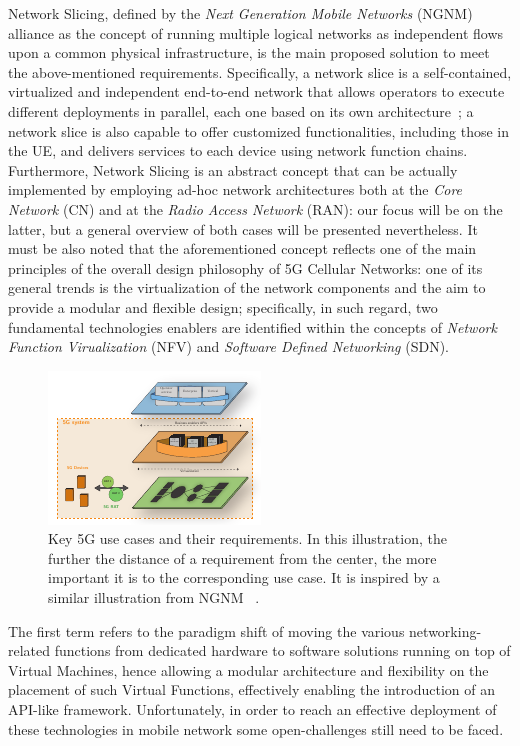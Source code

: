 \documentclass[11pt]{book}
\begin{document}
Network Slicing, defined by the \textit{Next Generation Mobile Networks} (NGNM) alliance as the concept of running multiple logical networks as independent flows upon a common physical infrastructure, is the main proposed solution to meet the above-mentioned requirements. Specifically, a network slice is a self-contained, virtualized and independent end-to-end network that allows operators to execute different deployments in parallel, each one based on its own architecture~\cite{alliance2016description}; a network slice is also capable to offer customized functionalities, including those in the UE, and delivers services to each device using network function chains. Furthermore, Network Slicing is an abstract concept that can be actually implemented by employing ad-hoc network architectures both at the \textit{Core Network} (CN) and at the \textit{Radio Access Network} (RAN): our focus will be on the latter, but a general overview of both cases will be presented nevertheless. 
It must be also noted that the aforementioned concept reflects one of the main principles of the overall design philosophy of 5G Cellular Networks: one of its general trends is the virtualization of the network components and the aim to provide a modular and flexible design; specifically, in such regard, two fundamental technologies enablers are identified within the concepts of \textit{Network Function Virualization} (NFV) and \textit{Software Defined Networking} (SDN)\cite{yousaf2017nfv, kaloxylos2018survey}. 
\begin{figure}[t]
    \centering
    \includegraphics[scale=3.65]{figures/NFV.pdf}
     \setlength\belowcaptionskip{.1cm}
  \caption{Key 5G use cases and their requirements. In this illustration, the further the distance of a requirement from the center, the more important it is to the corresponding use case. It is inspired by a similar illustration from NGNM ~\cite{alliance2015description}.}
    \label{Fig:NFV}
\end{figure}
The first term refers to the paradigm shift of moving the various networking-related functions from dedicated hardware to software solutions running on top of Virtual Machines, hence allowing a modular architecture and flexibility on the placement of such Virtual Functions, effectively enabling the introduction of an API-like framework. Unfortunately, in order to reach an effective deployment of these technologies in mobile network some open-challenges still need to be faced.
\end{document}
